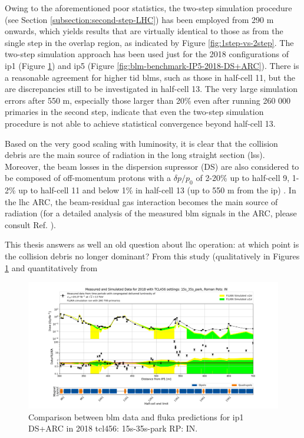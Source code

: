 \documentclass[encoding=utf8,british]{tumphthesis}
\begin{document}
Owing to the aforementioned poor statistics, the two-step simulation procedure (see Section \ref{subsection:second-step-LHC}) has been employed from 290 m onwards, which yields results that are virtually identical to those as from the single step in the overlap region, as indicated by Figure \ref{fig:1step-vs-2step}. The two-step simulation approach has been used just for the 2018 configurations of \acrshort{ip}1 (Figure \ref{fig:blm-benchmark-IP1-2018-DS+ARC}) and \acrshort{ip}5 (Figure \ref{fig:blm-benchmark-IP5-2018-DS+ARC}). There is a reasonable agreement for higher \acrshort{tid} \acrshort{blm}s, such as those in half-cell 11, but the are discrepancies still to be investigated in half-cell 13. The very large simulation errors after 550 m, especially those larger than 20\% even after running 260 000 primaries in the second step, indicate that even the two-step simulation procedure is not able to achieve statistical convergence beyond half-cell 13.

Based on the very good scaling with luminosity, it is clear that the collision debris are the main source of radiation in the long straight section (\acrshort{lss}). Moreover, the beam losses in the dispersion supressor (DS) are also considered to be composed of off-momentum protons with a $\delta p/p_0$ of 2-20\% up to half-cell 9, 1-2\% up to half-cell 11 and below 1\% in half-cell 13 (up to 550 m from the \acrshort{ip}) \cite{Tsinganis:2289480}. In the \acrshort{lhc} ARC, the beam-residual gas interaction becomes the main source of radiation (for a detailed analysis of the measured \acrshort{blm} signals in the ARC, please consult Ref. \cite{Biłko:2652979}).

This thesis answers as well an old question about \acrshort{lhc} operation: at which point is the collision debris no longer dominant? From this study (qualitatively in  Figures \ref{fig:blm-benchmark-IP1-2018-DS+ARC} and quantitatively from


\begin{figure}[H]
    \centering
    \includegraphics[width=0.9\linewidth]{results/benchmark_IR1_2018_DS+ARC_15s_35s_park_final.png}
    \caption{Comparison between \acrshort{blm} data and \acrshort{fluka} predictions for \acrshort{ip}1 DS+ARC in 2018 \acrshort{tcl}456: 15s-35s-park RP: IN.}
    \label{fig:blm-benchmark-IP1-2018-DS+ARC}
\end{figure}
\end{document}
